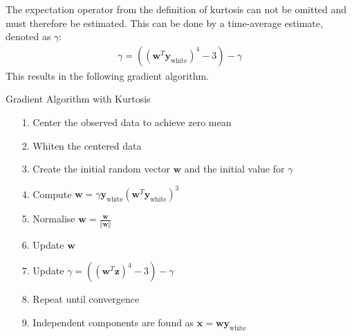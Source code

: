 The expectation operator from the definition of kurtosis can not be omitted and must therefore be estimated. This can be done by a time-average estimate, denoted as $\gamma$:
\begin{align*}
\gamma = ((\mathbf{w}^T \mathbf{y}_{\text{white}})^4 - 3) - \gamma
\end{align*}
This results in the following gradient algorithm.
\begin{algorithm}[H]
\caption{Gradient Algorithm with Kurtosis}
\begin{itemize}
\item[1.] Center the observed data to achieve zero mean
\item[2.] Whiten the centered data
\item[3.] Create the initial random vector $\mathbf{w}$ and the initial value for $\gamma$
\item[4.] Compute $\mathbf{w} = \gamma \mathbf{y}_{\text{white}} (\mathbf{w}^T \mathbf{y}_{\text{white}})^3$
\item[5.] Normalise $\mathbf{w} = \frac{\mathbf{w}}{\Vert \mathbf{w} \Vert}$
\item[6.] Update $\mathbf{w}$
\item[7.] Update $\gamma = ((\mathbf{w}^T \mathbf{z})^4 - 3) - \gamma$
\item[8.] Repeat until convergence
\item[9.] Independent components are found as $\mathbf{x} = \mathbf{w} \mathbf{y}_{\text{white}}$
\end{itemize}
\end{algorithm}

